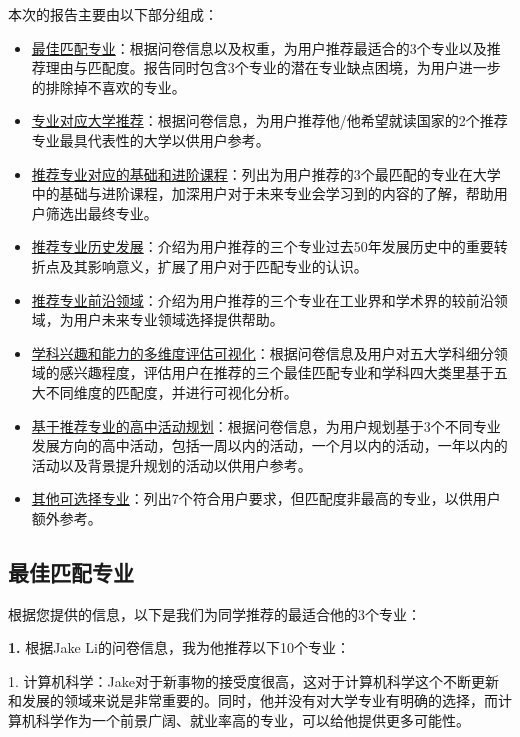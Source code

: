 \documentclass[12pt]{article}
\begin{document}
\begin{CJK*}{UTF8}{gbsn}
   \begin{flushleft}
   本次的报告主要由以下部分组成：
   \begin{itemize} 
       \item \underline{最佳匹配专业}：根据问卷信息以及权重，为用户推荐最适合的3个专业以及推荐理由与匹配度。报告同时包含3个专业的潜在专业缺点困境，为用户进一步的排除掉不喜欢的专业。
       \item \underline{专业对应大学推荐}：根据问卷信息，为用户推荐他/他希望就读国家的2个推荐专业最具代表性的大学以供用户参考。
       \item \underline{推荐专业对应的基础和进阶课程}：列出为用户推荐的3个最匹配的专业在大学中的基础与进阶课程，加深用户对于未来专业会学习到的内容的了解，帮助用户筛选出最终专业。
       \item \underline{推荐专业历史发展}：介绍为用户推荐的三个专业过去50年发展历史中的重要转折点及其影响意义，扩展了用户对于匹配专业的认识。
       \item \underline{推荐专业前沿领域}：介绍为用户推荐的三个专业在工业界和学术界的较前沿领域，为用户未来专业领域选择提供帮助。
       \item \underline{学科兴趣和能力的多维度评估可视化}：根据问卷信息及用户对五大学科细分领域的感兴趣程度，评估用户在推荐的三个最佳匹配专业和学科四大类里基于五大不同维度的匹配度，并进行可视化分析。
       \item \underline{基于推荐专业的高中活动规划}：根据问卷信息，为用户规划基于3个不同专业发展方向的高中活动，包括一周以内的活动，一个月以内的活动，一年以内的活动以及背景提升规划的活动以供用户参考。
       \item \underline{其他可选择专业}：列出7个符合用户要求，但匹配度非最高的专业，以供用户额外参考。
   \end{itemize}
   \end{flushleft}
   \hspace{0pt}
   \vfill
   



   \newpage
   \subsection*{最佳匹配专业}
   根据您提供的信息，以下是我们为同学推荐的最适合他的3个专业：
      
   \textbf{1.} 根据Jake Li的问卷信息，我为他推荐以下10个专业：

1. 计算机科学：Jake对于新事物的接受度很高，这对于计算机科学这个不断更新和发展的领域来说是非常重要的。同时，他并没有对大学专业有明确的选择，而计算机科学作为一个前景广阔、就业率高的专业，可以给他提供更多可能性。


\end{CJK*}
\end{document}
